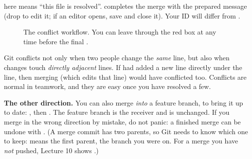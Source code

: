  here means ``this file is resolved''.  completes the merge with the prepared message  (drop  to edit it; if an editor opens, save and close it). Your ID will differ from .

\begin{figure}[H]
\centering
{}
\caption{The conflict workflow. You can leave through the red box at any time before the final .}
\label{fig:flow}
\end{figure}

\begin{quickfact}
Git conflicts not only when two people change the \emph{same} line, but also when changes touch \emph{directly adjacent} lines. If  had added a new line directly under the  line, then merging  (which edits that line) would have conflicted too. Conflicts are normal in teamwork, and they are easy once you have resolved a few.
\end{quickfact}

\begin{quickfact}
\textbf{The other direction.} You can also merge  \emph{into} a feature branch, to bring it up to date: , then . The feature branch is the receiver and  is unchanged. If you merge in the wrong direction by mistake, do not panic: a finished merge can be undone with . (A merge commit has two parents, so Git needs to know which one to keep:  means the first parent, the branch you were on. For a merge you have \emph{not} pushed, Lecture 10 shows .)
\end{quickfact}

